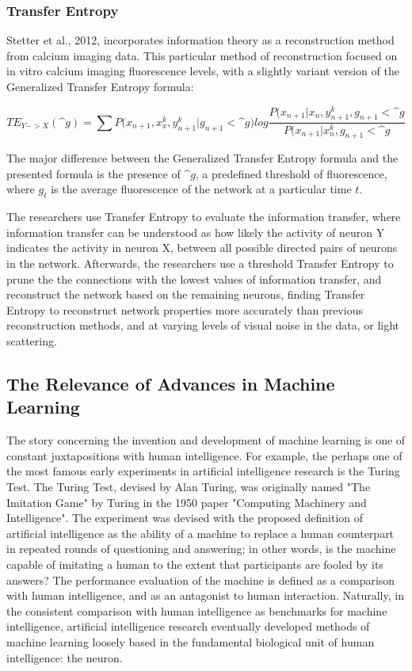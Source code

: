 \documentclass{article}
\begin{document}
\subsubsection{Transfer Entropy}
Stetter et al., 2012, incorporates information theory as a reconstruction method from calcium imaging data. This particular method of reconstruction focused on in vitro calcium imaging fluorescence levels, with a slightly variant version of the Generalized Transfer Entropy formula:

$$TE_{Y->X}(\^{g}) = \sum{P(x_{n+1}, x_x^k,y_{n+1}^k|g_{n+1}<\^{g}}) log \frac{P(x_{n+1}|x_n,y_{n+1}^k,g_{n+1}<\^{g}}{P(x_{n+1}|x_n^k,g_{n+1}<\^{g}}$$

The major difference between the Generalized Transfer Entropy formula and the presented formula is the presence of $\^g$, a predefined threshold of fluorescence, where $g_t$ is the average fluorescence of the network at a particular time $t$.\par

The researchers use Transfer Entropy to evaluate the information transfer, where information transfer can be understood as how likely the activity of neuron Y indicates the activity in neuron X, between all possible directed pairs of neurons in the network. Afterwards, the researchers use a threshold Transfer Entropy to prune the the connections with the lowest values of information transfer, and reconstruct the network based on the remaining neurons, finding Transfer Entropy to reconstruct network properties more accurately than previous reconstruction methods, and at varying levels of visual noise in the data, or light scattering.\par

\subsection{The Relevance of Advances in Machine Learning}
The story concerning the invention and development of machine learning is one of constant juxtapositions with human intelligence. For example, the perhaps one of the most famous early experiments in artificial intelligence research is the Turing Test. The Turing Test, devised by Alan Turing, was originally named "The Imitation Game" by Turing in the 1950 paper "Computing Machinery and Intelligence". The experiment was devised with the proposed definition of artificial intelligence as the ability of a machine to replace a human counterpart in repeated rounds of questioning and answering; in other words, is the machine capable of imitating a human to the extent that participants are fooled by its answers? The performance evaluation of the machine is defined as a comparison with human intelligence, and as an antagonist to human interaction. Naturally, in the consistent comparison with human intelligence as benchmarks for machine intelligence, artificial intelligence research eventually developed methods of machine learning loosely based in the fundamental biological unit of human intelligence: the neuron.\par
\end{document}
